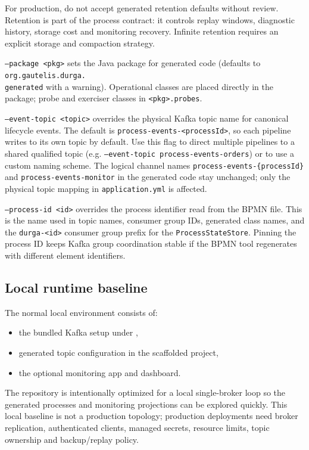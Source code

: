 For production, do not accept generated retention defaults without review.
Retention is part of the process contract: it controls replay windows,
diagnostic history, storage cost and monitoring recovery. Infinite retention
requires an explicit storage and compaction strategy.

\texttt{--package <pkg>} sets the Java package for generated code
(defaults to \texttt{org.gautelis.durga.\\generated} with a warning).
Operational classes are placed directly in the package; probe and
exerciser classes in \texttt{<pkg>.probes}.

\texttt{--event-topic <topic>} overrides the physical Kafka topic name for
canonical lifecycle events. The default is \texttt{process-events-<processId>},
so each pipeline writes to its own topic by default. Use this flag to direct
multiple pipelines to a shared qualified topic (e.g. \texttt{--event-topic process-events-orders})
or to use a custom naming scheme. The logical channel names
\texttt{process-events-\{processId\}} and \texttt{process-events-monitor} in the
generated code stay unchanged; only the physical topic mapping in
\texttt{application.yml} is affected.

\texttt{--process-id <id>} overrides the process identifier read from the
BPMN file. This is the name used in topic names, consumer group IDs,
generated class names, and the \texttt{durga-<id>} consumer group prefix
for the \texttt{ProcessStateStore}. Pinning the process ID keeps Kafka
group coordination stable if the BPMN tool regenerates with different
element identifiers.

\subsection{Local runtime baseline}

The normal local environment consists of:
\begin{itemize}
\item the bundled Kafka setup under ,
\item generated topic configuration in the scaffolded project,
\item the optional monitoring app and dashboard.
\end{itemize}

The repository is intentionally optimized for a local single-broker loop so the generated
processes and monitoring projections can be explored quickly. This local
baseline is not a production topology; production deployments need broker
replication, authenticated clients, managed secrets, resource limits, topic
ownership and backup/replay policy.

